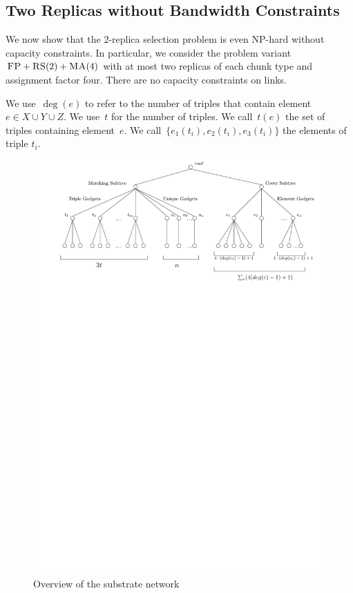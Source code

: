 \documentclass[preprint,12pt]{elsarticle}
\newcommand{\FP}{\textsc{FP}}
\newcommand{\RS}{\textsc{RS}}
\newcommand{\MA}{\textsc{MA}}
\begin{document}
\subsection{Two Replicas without Bandwidth Constraints}

We now show that the 2-replica selection problem is even NP-hard
without capacity constraints.  In particular, we consider the problem
variant~$\FP+\RS(2)+\MA(4)$ with at most two replicas of each chunk type and assignment factor
four. There are no capacity constraints on links.

We use~$\deg(e)$ to refer to the number of triples that contain
element~$e\in X\cup Y\cup Z$.  We use~$t$ for the number of
triples. We call~$t(e)$ the set of triples containing element~$e$. We
call~$\lbrace e_1(t_i), e_2(t_i), e_3(t_i) \rbrace$ the elements of triple
$t_i$.

\begin{figure}[t]
  \centering
  \includegraphics[width=0.99\columnwidth]{reduction/overview.pdf}
  \vspace{-1em}
  \caption{Overview of the substrate network}
  \vspace{-1em}
\end{figure}
\end{document}
